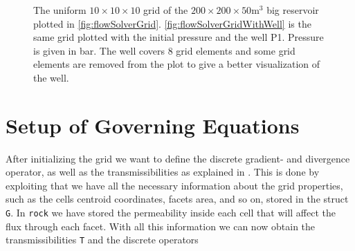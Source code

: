 \begin{figure}[H]
\begin{subfigure}[t]{0.48\textwidth}
        \caption{}
        \label{fig:flowSolverGridWithWell}
    \end{subfigure}
    \caption{The uniform $10\times 10 \times 10$ grid of the $200\times 200 \times 50 \text{m}^3$ big reservoir plotted in \autoref{fig:flowSolverGrid}. \autoref{fig:flowSolverGridWithWell} is the same grid plotted with the initial pressure and the well P1. Pressure is given in bar. The well covers 8 grid elements and some grid elements are removed from the plot to give a better visualization of the well.}
\end{figure}

\section{Setup of Governing Equations}
\label{sec:setupGovEq}
After initializing the grid we want to define the discrete gradient- and divergence operator, as well as the transmissibilities as explained in . This is done by exploiting that we have all the necessary information about the grid properties, such as the cells centroid coordinates, facets area, and so on, stored in the struct \texttt{G}. In \texttt{rock} we have stored the permeability inside each cell that will affect the flux through each facet. With all this information we can now obtain the transmissibilities \texttt{T} and the discrete operators


